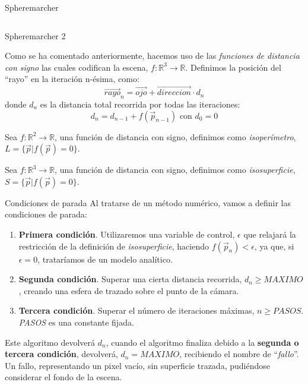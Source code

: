 \begin{frame}{Spheremarcher}
\begin{columns}[onlytextwidth]
    \end{columns}

\end{frame}


\begin{frame}{Spheremarcher 2}

    Como se ha comentado anteriormente, hacemos uso de las \textit{funciones de distancia con signo} las cuales codifican la escena, \(f:\mathbb{R}^3\longrightarrow\mathbb{R}\). Definimos la posición del \enquote{rayo} en la iteración n-ésima, como:
    \[ \Vec{rayo}_{n}=\Vec{ojo} + \Vec{direccion} \cdot d_{n} \]
    donde \(d_{n}\) es la distancia total recorrida por todas las iteraciones:
    \[d_{n}=d_{n-1} + f(\Vec{p}_{n-1})\text{ con } d_0=0\]
    
    \begin{definition}
        Sea \(f:\mathbb{R}^2\longrightarrow\mathbb{R}\), una función de distancia con signo, definimos como \textit{isoperímetro}, \(L=\{\Vec{p} \vert f(\Vec{p})=0\}\).
    \end{definition}
    
    \begin{definition}
        Sea \(f:\mathbb{R}^3\longrightarrow\mathbb{R}\), una función de distancia con signo, definimos como \textit{isosuperficie}, \(S=\{\Vec{p} \vert f(\Vec{p})=0\}\).
    \end{definition}

\end{frame}

\begin{frame}{Condiciones de parada}
    Al tratarse de un método numérico, vamos a definir las condiciones de parada:
    \vfill
    \begin{enumerate}
        \item \textbf{Primera condición}. Utilizaremos una variable de control, \(\epsilon\) que relajará la restricción de la definición de  \textit{isosuperficie}, haciendo \(f(\Vec{p}_n) < \epsilon\), ya que, si \(\epsilon = 0\), trataríamos de un modelo analítico.
        \item \textbf{Segunda condición}. Superar una cierta distancia recorrida, \(d_{n}\ge MAXIMO\), creando una esfera de trazado sobre el punto de la cámara.
        \item \textbf{Tercera condición}. Superar el número de iteraciones máximas, \(n \ge PASOS\). \textit{PASOS} es una constante fijada.
    \end{enumerate}
    \vfill
    Este algoritmo devolverá \(d_n\), cuando el algoritmo finaliza debido a la \textbf{segunda o tercera condición}, devolverá, \(d_n=MAXIMO\), recibiendo el nombre de \enquote{\textit{fallo}}. Un fallo, representando un pixel vacío, sin superficie trazada, pudiéndose considerar el fondo de la escena.
    
\end{frame}